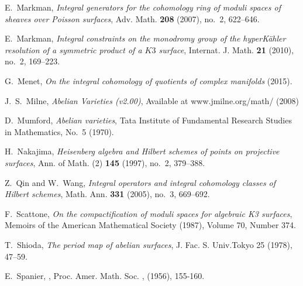 \begin{thebibliography}{10}
E.~Markman, \emph{Integral generators for the cohomology ring of moduli spaces of
  sheaves over Poisson surfaces}, Adv. Math. \textbf{208} (2007), no.~2,
  622--646.

E.~Markman, \emph{Integral constraints on the monodromy group of the
  hyper{K}\"ahler resolution of a symmetric product of a {$K3$} surface},
  Internat. J. Math. \textbf{21} (2010), no.~2, 169--223.

G.~Menet, \emph{On the integral cohomology of quotients of complex manifolds} (2015).

J.~S.~Milne, \emph{Abelian Varieties (v2.00)}, Available at www.jmilne.org/math/ (2008)  

D.~Mumford, \emph{Abelian varieties}, Tata Institute of Fundamental Research Studies in Mathematics, 
  No.~5 (1970).

H.~Nakajima, \emph{Heisenberg algebra and Hilbert schemes of points on
  projective surfaces}, Ann. of Math. (2) \textbf{145} (1997), no.~2, 379--388.

Z.~Qin and W.~Wang, \emph{Integral operators and integral cohomology classes of
  {H}ilbert schemes}, Math. Ann. \textbf{331} (2005), no.~3, 669--692.

F.~Scattone, \emph{On the compactification of moduli spaces for algebraic K3 surfaces},
  Memoirs of the American Mathematical Society (1987), Volume 70, Number 374.

T.~Shioda, \emph{The period map of abelian surfaces}, J. Fac. S. Univ.Tokyo 25 (1978), 47--59.

E.~Spanier, 
,
\newblock Proc. Amer. Math. Soc.
, (1956), 155-160.

\end{thebibliography}